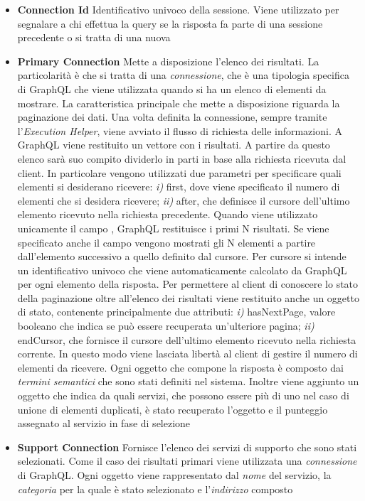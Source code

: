 \begin{itemize}
	\item \textbf{Connection Id} Identificativo univoco della sessione. Viene utilizzato per segnalare a chi effettua la query se la risposta fa parte di una sessione precedente o si tratta di una nuova
	\item \textbf{Primary Connection} Mette a disposizione l'elenco dei risultati. La particolarità è che si tratta di una \emph{connessione}, che è una tipologia specifica di GraphQL che viene utilizzata quando si ha un elenco di elementi da mostrare. La caratteristica principale che mette a disposizione riguarda la paginazione dei dati. Una volta definita la connessione, sempre tramite l'\emph{Execution Helper}, viene avviato il flusso di richiesta delle informazioni. A GraphQL viene restituito un vettore con i risultati. A partire da questo elenco sarà suo compito dividerlo in parti in base alla richiesta ricevuta dal client. In particolare vengono utilizzati due parametri per specificare quali elementi si desiderano ricevere: \emph{i)} first, dove viene specificato il numero di elementi che si desidera ricevere; \emph{ii)} after, che definisce il cursore dell'ultimo elemento ricevuto nella richiesta precedente. Quando viene utilizzato unicamente il campo , GraphQL restituisce i primi N risultati. Se viene specificato anche il campo  vengono mostrati gli N elementi a partire dall'elemento successivo a quello definito dal cursore. Per cursore si intende un identificativo univoco che viene automaticamente calcolato da GraphQL per ogni elemento della risposta. Per permettere al client di conoscere lo stato della paginazione oltre all'elenco dei risultati viene restituito anche un oggetto di stato, contenente principalmente due attributi: \emph{i)} hasNextPage, valore booleano che indica se può essere recuperata un'ulteriore pagina; \emph{ii)} endCursor, che fornisce il cursore dell'ultimo elemento ricevuto nella richiesta corrente. In questo modo viene lasciata libertà al client di gestire il numero di elementi da ricevere. Ogni oggetto che compone la risposta è composto dai \emph{termini semantici} che sono stati definiti nel sistema. Inoltre viene aggiunto un oggetto che indica da quali servizi, che possono essere più di uno nel caso di unione di elementi duplicati, è stato recuperato l'oggetto e il punteggio assegnato al servizio in fase di selezione
	\item \textbf{Support Connection} Fornisce l'elenco dei servizi di supporto che sono stati selezionati. Come il caso dei risultati primari viene utilizzata una \emph{connessione} di GraphQL. Ogni oggetto viene rappresentato dal \emph{nome} del servizio, la \emph{categoria} per la quale è stato selezionato e l'\emph{indirizzo} composto
\end{itemize}

